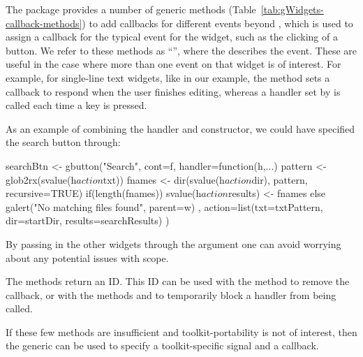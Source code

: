 The package provides a number of generic methods
(Table~\ref{tab:gWidgets-callback-methods}) to add callbacks for
different events beyond , which is used to
assign a callback for the typical event for the widget, such as the
clicking of a button. We refer to these methods as
``'', where the  describes the
event. These are useful in the case where more than one event on that
widget is of interest. For example, for single-line text widgets, like
 in our example, the  method
sets a callback to respond when the user finishes editing, whereas a
handler set by  is called each time a key is
pressed.

As an example of combining the handler and constructor, we could have
specified the search button through:
\begin{Schunk}
\begin{Sinput}
 searchBtn <- gbutton("Search", cont=f,
              handler=function(h,...) {
                pattern <- glob2rx(svalue(h$action$txt))
                fnames <- dir(svalue(h$action$dir), 
                              pattern, recursive=TRUE)
                if(length(fnames))
                  svalue(h$action$results) <- fnames
                else
                  galert("No matching files found", parent=w)
              },
              action=list(txt=txtPattern, dir=startDir,
                results=searchResults)
              )
\end{Sinput}
\end{Schunk}
%
By passing in the other widgets through the  argument one
can avoid worrying about any potential issues with scope.

The  methods return an ID.  This ID can be used
with the method  to remove the callback, or with
the methods  and  to
temporarily block a handler from being called.

If these few methods are insufficient and toolkit-portability is not
of interest, then the  generic can be used to specify
a toolkit-specific signal and a callback.


